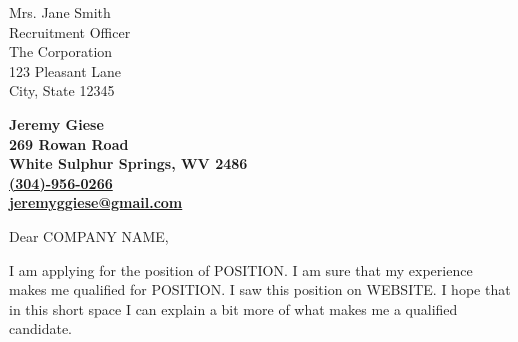 \documentclass[11pt]{letter} %
\begin{document}

\begin{letter}{Mrs. Jane Smith \\
Recruitment Officer \\
The Corporation \\
123 Pleasant Lane \\
City, State 12345} 


\begin{center}
\large\bf Jeremy Giese \\ %
269 Rowan Road \\ White Sulphur Springs, WV 2486 \\ \href{tel:3049560266}{(304)-956-0266} \\ \href{mailto:jeremyggiese@gmail.com}{jeremyggiese@gmail.com} %
\end{center} 
\vfill

\signature{Jeremy Giese} %


\opening{Dear COMPANY NAME,} 

I am applying for the position of POSITION. I am sure that my experience makes me qualified for POSITION. I saw this position on WEBSITE. I hope that in this short space I can explain a bit more of what makes me a qualified candidate. 
 

\end{letter}
\end{document}
